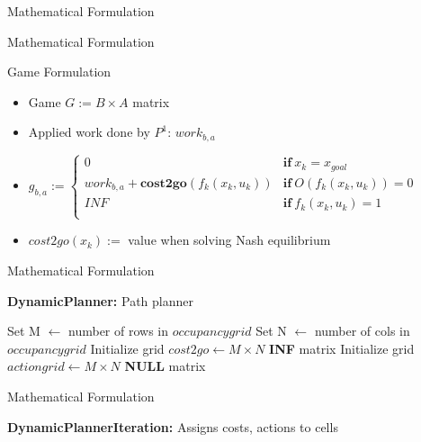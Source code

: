 \documentclass[xcolor=table, 9pt]{beamer}
\begin{document}
\begin{section}{Mathematical Formulation}
    \begin{frame}{Mathematical Formulation}
        \begin{block}{Game Formulation}    
            \begin{itemize}
                \item Game $G := B \times A$ matrix
                \item Applied work done by $P^1$: ${work}_{b,a}$ 
                \item $g_{b,a} := \begin{cases} 
              0 & \textbf{if} \: x_k = x_{goal} \\
              {work}_{b, a} + \textbf{cost2go}(f_k(x_k, u_k)) & \textbf{if} \: O(f_k(x_k, u_k)) = 0 \\
              INF & \textbf{if} \: f_k(x_k, u_k) = 1 \\
            \end{cases}
            $
            \item $cost2go(x_k) :=$ value when solving Nash equilibrium
            \end{itemize}
        \end{block}
    \end{frame}       
    \begin{frame}{Mathematical Formulation}    
        \begin{algorithm}[H]
        \caption[DynamicPlanner]{\textbf{DynamicPlanner:} Path planner} 
        \label{alg:dynamicPlanner}
        \SetAlgoVlined
        Set M $\leftarrow$ number of rows in $occupancygrid$\;
        Set N $\leftarrow$ number of cols in $occupancygrid$\;
        Initialize grid $cost2go \leftarrow M \times N$ \textbf{INF} matrix\;
        Initialize grid $actiongrid \leftarrow M \times N$ \textbf{NULL} matrix\;
        \end{algorithm}
    \end{frame}
    \begin{frame}{Mathematical Formulation}    
        \begin{algorithm}[H]
        \caption[DynamicPlannerIteration]{\textbf{DynamicPlannerIteration:} Assigns costs, actions to cells } 
        \label{alg:dynamicPlannerIteration}
        \SetAlgoVlined

\end{algorithm}
\end{frame}
\end{section}
\end{document}

